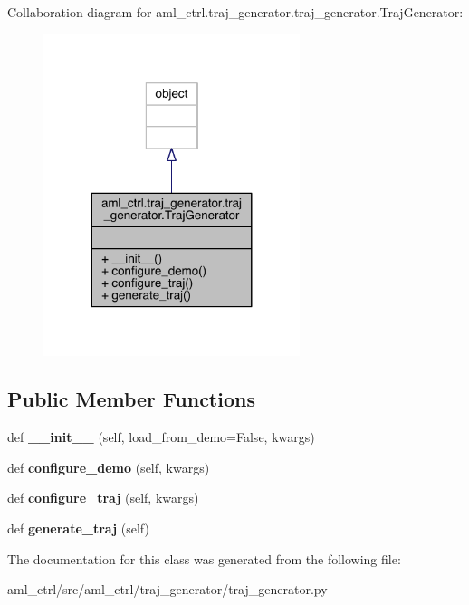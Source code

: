 Collaboration diagram for aml\+\_\+ctrl.\+traj\+\_\+generator.\+traj\+\_\+generator.\+Traj\+Generator\+:\nopagebreak
\begin{figure}[H]
\begin{center}
\leavevmode
\includegraphics[width=212pt]{classaml__ctrl_1_1traj__generator_1_1traj__generator_1_1_traj_generator__coll__graph}
\end{center}
\end{figure}
\subsection*{Public Member Functions}
\begin{DoxyCompactItemize}
\item 
\hypertarget{classaml__ctrl_1_1traj__generator_1_1traj__generator_1_1_traj_generator_aa9c75d31f611a9eb95dedeee6a4ede30}{}\label{classaml__ctrl_1_1traj__generator_1_1traj__generator_1_1_traj_generator_aa9c75d31f611a9eb95dedeee6a4ede30} 
def {\bfseries \+\_\+\+\_\+init\+\_\+\+\_\+} (self, load\+\_\+from\+\_\+demo=False, kwargs)
\item 
\hypertarget{classaml__ctrl_1_1traj__generator_1_1traj__generator_1_1_traj_generator_a1856f24f82f45a4aac8361d5fb921dc8}{}\label{classaml__ctrl_1_1traj__generator_1_1traj__generator_1_1_traj_generator_a1856f24f82f45a4aac8361d5fb921dc8} 
def {\bfseries configure\+\_\+demo} (self, kwargs)
\item 
\hypertarget{classaml__ctrl_1_1traj__generator_1_1traj__generator_1_1_traj_generator_ac12784ead1aeab27a3a7c88303a53b37}{}\label{classaml__ctrl_1_1traj__generator_1_1traj__generator_1_1_traj_generator_ac12784ead1aeab27a3a7c88303a53b37} 
def {\bfseries configure\+\_\+traj} (self, kwargs)
\item 
\hypertarget{classaml__ctrl_1_1traj__generator_1_1traj__generator_1_1_traj_generator_a2badb88129d73b76bb338098b0792247}{}\label{classaml__ctrl_1_1traj__generator_1_1traj__generator_1_1_traj_generator_a2badb88129d73b76bb338098b0792247} 
def {\bfseries generate\+\_\+traj} (self)
\end{DoxyCompactItemize}


The documentation for this class was generated from the following file\+:\begin{DoxyCompactItemize}
\item 
aml\+\_\+ctrl/src/aml\+\_\+ctrl/traj\+\_\+generator/traj\+\_\+generator.\+py\end{DoxyCompactItemize}
